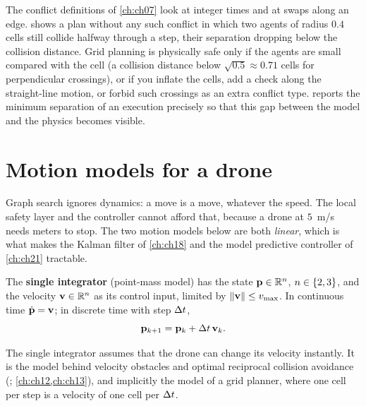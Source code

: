 \begin{pitfall}
The conflict definitions of \cref{ch:ch07} look at integer times and at swaps along an edge.  shows a plan without any such conflict in which two agents of radius $0.4$ cells still collide halfway through a step, their separation dropping below the collision distance. Grid planning is physically safe only if the agents are small compared with the cell (a collision distance below $\sqrt{0.5}\approx0.71$ cells for perpendicular crossings), or if you inflate the cells, add a check along the straight-line motion, or forbid such crossings as an extra conflict type.  reports the minimum separation of an execution precisely so that this gap between the model and the physics becomes visible.
\end{pitfall}

\section{Motion models for a drone}
\label{sec:ch02-motion}

Graph search ignores dynamics: a move is a move, whatever the speed. The local safety layer and the controller cannot afford that, because a drone at $5$~m/s needs meters to stop. The two motion models below are both \emph{linear}, which is what makes the Kalman filter of \cref{ch:ch18} and the model predictive controller of \cref{ch:ch21} tractable.

\begin{definition}
\label{def:ch02-single-integrator}
The \textbf{single integrator} (point-mass model) has the state $\mathbf{p}\in\mathbb{R}^n$, $n\in\left\{ 2,3 \right\}$, and the velocity $\mathbf{v}\in\mathbb{R}^n$ as its control input, limited by $\left\lVert \mathbf{v} \right\rVert\le v_{\max}$. In continuous time $\dot{\mathbf{p}}=\mathbf{v}$; in discrete time with step $\Delta t$,
\begin{equation}
\mathbf{p}_{k+1}=\mathbf{p}_k+\Delta t\,\mathbf{v}_k .
\label{eq:ch02-single-integrator}
\end{equation}
\end{definition}

The single integrator assumes that the drone can change its velocity instantly. It is the model behind velocity obstacles and optimal reciprocal collision avoidance (\orca; \cref{ch:ch12,ch:ch13}), and implicitly the model of a grid planner, where one cell per step is a velocity of one cell per $\Delta t$.

